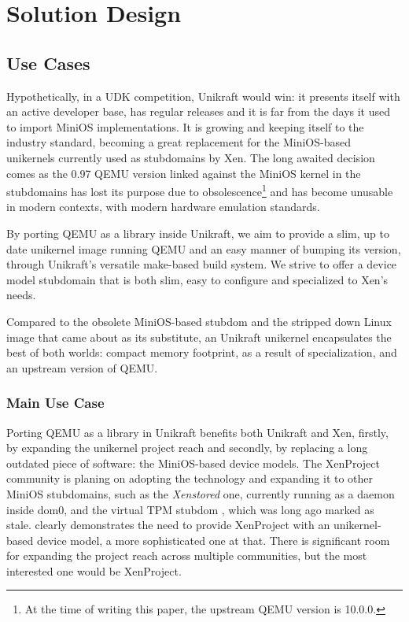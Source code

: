 \chapter{Solution Design}
\label{chapter:sol-design}

\section{Use Cases}
\label{sec:use-cases}

Hypothetically, in a UDK competition, Unikraft would win: it presents itself with an active developer base, has regular releases and it is far from the days it used to import MiniOS implementations.
It is growing and keeping itself to the industry standard, becoming a great replacement for the MiniOS-based unikernels currently used as stubdomains by Xen.
The long awaited decision comes as the 0.97 QEMU version linked against the MiniOS kernel in the stubdomains has lost its purpose due to obsolescence\footnote{At the time of writing this paper, the upstream QEMU version is 10.0.0.} and has become unusable in modern contexts, with modern hardware emulation standards.

By porting QEMU as a library inside Unikraft, we aim to provide a slim, up to date unikernel image running QEMU and an easy manner of bumping its version, through Unikraft's versatile make-based build system.
We strive to offer a device model stubdomain that is both slim, easy to configure and specialized to Xen's needs.

Compared to the obsolete MiniOS-based stubdom and the stripped down Linux image that came about as its substitute, an Unikraft unikernel encapsulates the best of both worlds: compact memory footprint, as a result of specialization, and an upstream version of QEMU.

\subsection{Main Use Case}
\label{subsec:main-usecase}

Porting QEMU as a library in Unikraft benefits both Unikraft and Xen, firstly, by expanding the unikernel project reach and secondly, by replacing a long outdated piece of software: the MiniOS-based device models.
The XenProject community is planing on adopting the technology and expanding it to other MiniOS stubdomains, such as the \textit{Xenstored} \cite{xenstored-stubdom} one, currently running as a daemon inside dom0, and the virtual TPM stubdom \cite{xen-tpm-stubdom}, which was long ago marked as stale.
 clearly demonstrates the need to provide XenProject with an unikernel-based device model, a more sophisticated one at that.
There is significant room for expanding the project reach across multiple communities, but the most interested one would be XenProject.

